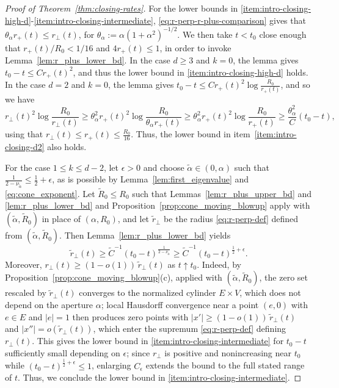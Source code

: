 \documentclass[11pt]{amsart}
\numberwithin{equation}{section}
\numberwithin{figure}{section}
\theoremstyle{plain}
\theoremstyle{definition}
\theoremstyle{remark}
\theoremstyle{plain}
\newcommand{\abs}[1]{\lvert #1 \rvert}
\begin{document}
\begin{proof}[Proof of Theorem~\ref{thm:closing-rates}]
For the lower bounds in \ref{item:intro-closing-high-d}-\ref{item:intro-closing-intermediate}, \eqref{eq:r-perp-r-plus-comparison} gives that $\theta_\alpha r_+(t) \leq r_\perp(t)$, for $\theta_\alpha := \alpha(1 + \alpha^2)^{-1/2}$. We then take $t < t_0$ close enough that $r_+(t)/R_0<1/16$ and $4r_+(t)\leq1$, in order to invoke Lemma~\ref{lem:r_plus_lower_bd}. In the case $d\geq3$ and $k=0$, the lemma gives $t_0-t\leq Cr_+(t)^2$, and thus the lower bound in \ref{item:intro-closing-high-d} holds.
In the case $d=2$ and $k=0$, the lemma gives $t_0 - t \leq C r_+(t)^2 \log \frac{R_0}{r_+(t)}$, and so we have \[ r_\perp(t)^2 \log \frac{R_0}{r_\perp(t)} \geq \theta_\alpha^{2}r_+(t)^2\log\frac{R_0}{\theta_\alpha r_+(t)} \geq \theta_\alpha^{2}r_+(t)^2\log\frac{R_0}{r_+(t)} \geq \frac{\theta_\alpha^2 }{C}(t_0 - t), \]
using that $r_\perp(t) \leq r_+(t) \leq \frac{R_0}{16}$. Thus, the lower
bound in item~\ref{item:intro-closing-d2} also holds.

For the case $1 \leq k \leq d-2$, let $\epsilon > 0$ and choose $\tilde{\alpha} \in (0, \alpha)$ such that $\frac{1}{2 - \nu_{\tilde{\alpha}}} \leq \frac{1}{2} + \epsilon$, as is possible by
Lemma~\ref{lem:first_eigenvalue} and \eqref{eq:cone_exponent}. Let 
$\widetilde R_0\leq R_0$ such that Lemmas~\ref{lem:r_plus_upper_bd} and
\ref{lem:r_plus_lower_bd} and Proposition~\ref{prop:cone_moving_blowup} apply
with $(\widetilde\alpha,\widetilde R_0)$ in place of $(\alpha,R_0)$, and let
$\widetilde r_\perp$ be the radius \eqref{eq:r-perp-def} defined from
$(\widetilde\alpha,\widetilde R_0)$. Then Lemma~\ref{lem:r_plus_lower_bd} yields
\[
    \widetilde r_\perp(t)
    \geq\widetilde C^{-1}(t_0-t)^{\frac{1}{2-\nu_{\widetilde\alpha}}}
    \geq\widetilde C^{-1}(t_0-t)^{\frac12+\epsilon}.
\]
Moreover, $r_\perp(t)\geq(1-o(1))\,\widetilde r_\perp(t)$ as $t\uparrow t_0$.
Indeed, by Proposition~\ref{prop:cone_moving_blowup}(c), applied with
$(\widetilde\alpha,\widetilde R_0)$, the zero set rescaled by
$\widetilde r_\perp(t)$ converges to the normalized cylinder $E \times V$, which does
not depend on the aperture $\alpha$; local Hausdorff convergence near a point $(e,0)$
with $e\in E$ and $\abs e=1$ then produces zero points with
$\abs{x'}\geq(1-o(1))\,\widetilde r_\perp(t)$ and
$\abs{x''}=o(\widetilde r_\perp(t))$, which enter the supremum
\eqref{eq:r-perp-def} defining $r_\perp(t)$. This gives the lower bound in
\ref{item:intro-closing-intermediate} for $t_0-t$ sufficiently small depending
on $\epsilon$; since $r_\perp$ is positive and nonincreasing near $t_0$ while
$(t_0-t)^{\frac12+\epsilon}\leq1$, enlarging $C_\epsilon$ extends the bound to
the full stated range of $t$. Thus, we conclude the lower bound in \ref{item:intro-closing-intermediate}.

\end{proof}
\end{document}
